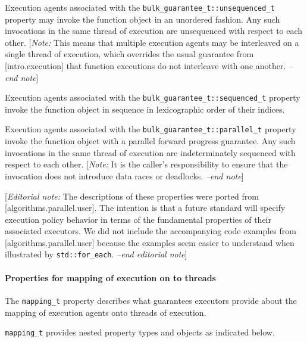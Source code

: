 \documentclass[a4paper,12pt,notitlepage,twoside,openright]{article}
\begin{document}
Execution agents associated with the
\texttt{bulk_guarantee_t::unsequenced_t} property may invoke
the function object in an unordered fashion. Any such invocations in the
same thread of execution are unsequenced with respect to each other.
{[}\emph{Note:} This means that multiple execution agents may be
interleaved on a single thread of execution, which overrides the usual
guarantee from {[}intro.execution{]} that function executions do not
interleave with one another. \emph{--end note}{]}

Execution agents associated with the
\texttt{bulk_guarantee_t::sequenced_t} property invoke the
function object in sequence in lexicographic order of their indices.

Execution agents associated with the
\texttt{bulk_guarantee_t::parallel_t} property invoke the
function object with a parallel forward progress guarantee. Any such
invocations in the same thread of execution are indeterminately
sequenced with respect to each other. {[}\emph{Note:} It is the caller's
responsibility to ensure that the invocation does not introduce data
races or deadlocks. \emph{--end note}{]}

{[}\emph{Editorial note:} The descriptions of these properties were
ported from {[}algorithms.parallel.user{]}. The intention is that a
future standard will specify execution policy behavior in terms of the
fundamental properties of their associated executors. We did not include
the accompanying code examples from {[}algorithms.parallel.user{]}
because the examples seem easier to understand when illustrated by
\texttt{std::for_each}. \emph{--end editorial note}{]}

\hypertarget{properties-for-mapping-of-execution-on-to-threads}{%
\paragraph{Properties for mapping of execution on to
threads}\label{properties-for-mapping-of-execution-on-to-threads}}

The \texttt{mapping_t} property describes what guarantees
executors provide about the mapping of execution agents onto threads of
execution.

\texttt{mapping_t} provides nested property types and
objects as indicated below.
\end{document}
